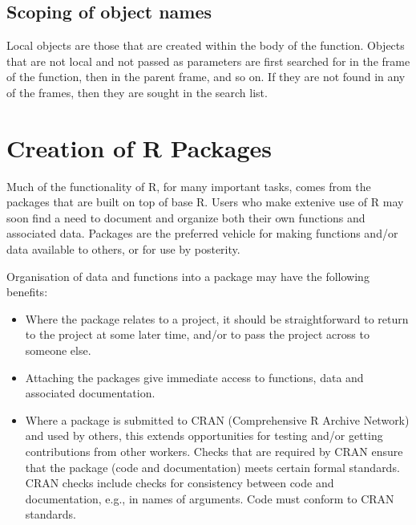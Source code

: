 \documentclass{tufte-book}\usepackage[]{graphicx}\usepackage[]{color}
\begin{document}
\subsection*{Scoping of object names}
Local objects are those that are created within the body of the
function.  Objects that are not local and not passed as parameters are
first searched for in the frame of the function, then in the parent
frame, and so on. If they are not found in any of the frames, then
they are sought in the search list.

\section{Creation of R Packages}
Much of the functionality of R, for many important tasks, comes from
the packages that are built on top of base R. Users who make extenive
use of R may soon find a need to document and organize both their
own functions and associated data. Packages are the preferred vehicle
for making functions and/or data available to others, or for use by
posterity.

Organisation of data and functions into a package may have the
following benefits:
\begin{itemize}
\item Where the package relates to a project, it should be straightforward
to return to the project at some later time, and/or to pass the project
across to someone else.
\item Attaching the packages give immediate access to functions, data
  and associated documentation.
\item Where a package is submitted to CRAN (Comprehensive R Archive
  Network) and used by others, this extends opportunities for testing
  and/or getting contributions from other workers. Checks that are
  required by CRAN ensure that the package (code and documentation)
  meets certain formal standards.  CRAN checks include checks for
  consistency between code and documentation, e.g., in names of
  arguments.  Code must conform to CRAN standards.
\end{itemize}
\end{document}
